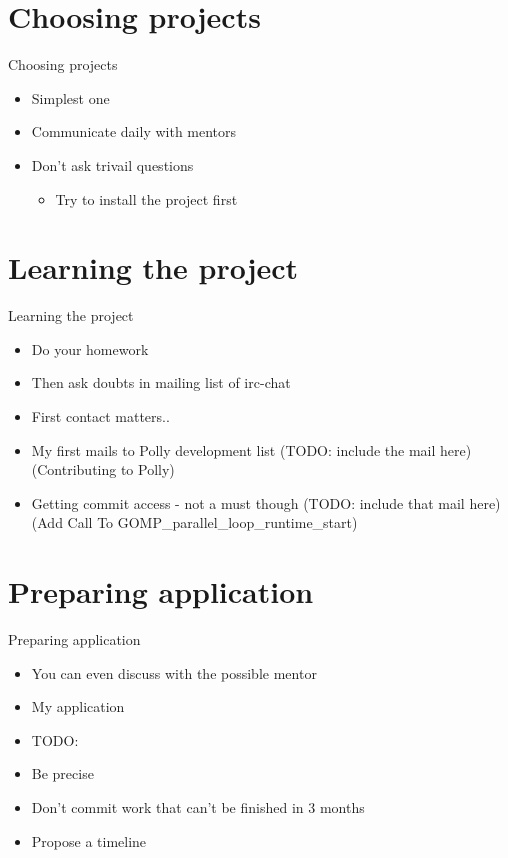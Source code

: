 \documentclass{beamer}
\begin{document}
\section{Choosing projects}
\begin{frame}{Choosing projects}
\begin{itemize}
\begin{block}
{Starting to contribute to a project earlier is the natural way to enter GSOC.
In that sense this is a long term commitment}
\end{block}
\item Simplest one
\item Communicate daily with mentors
\item Don't ask trivail questions
  \begin{itemize}
  \item Try to install the project first
  \end{itemize}
\end{itemize}
\end{frame}

\section{Learning the project}
\begin{frame}{Learning the project}
\begin{itemize}
\item Do your homework
\item Then ask doubts in mailing list of irc-chat
\item First contact matters..
\item My first mails to Polly development list (TODO: include the mail here)(Contributing to Polly)
\item Getting commit access - not a must though (TODO: include that mail here)(Add Call To GOMP\_parallel\_loop\_runtime\_start)
\end{itemize}
\end{frame}

\section{Preparing application}
\begin{frame}{Preparing application}
\begin{itemize}
\item You can even discuss with the possible mentor
\item My application
\item TODO: 
\item Be precise
\item Don't commit work that can't be finished in 3 months
\item Propose a timeline
\end{itemize}
\end{frame}
\end{document}
